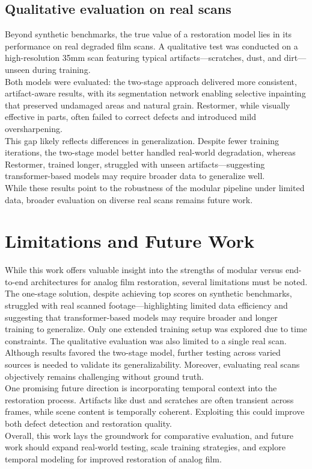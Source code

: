 \documentclass[10pt,a4paper,twocolumn,twoside]{article}
\begin{document}
\subsection{Qualitative evaluation on real scans}
Beyond synthetic benchmarks, the true value of a restoration model lies in its performance on real degraded film scans. A qualitative test was conducted on a high-resolution 35mm scan featuring typical artifacts—scratches, dust, and dirt—unseen during training. \\
Both models were evaluated: the two-stage approach delivered more consistent, artifact-aware results, with its segmentation network enabling selective inpainting that preserved undamaged areas and natural grain. Restormer, while visually effective in parts, often failed to correct defects and introduced mild oversharpening. \\
This gap likely reflects differences in generalization. Despite fewer training iterations, the two-stage model better handled real-world degradation, whereas Restormer, trained longer, struggled with unseen artifacts—suggesting transformer-based models may require broader data to generalize well. \\
While these results point to the robustness of the modular pipeline under limited data, broader evaluation on diverse real scans remains future work.
\section{Limitations and Future Work}
While this work offers valuable insight into the strengths of modular versus end-to-end architectures for analog film restoration, several limitations must be noted. \\ The one-stage solution, despite achieving top scores on synthetic benchmarks, struggled with real scanned footage—highlighting limited data efficiency and suggesting that transformer-based models may require broader and longer training to generalize. Only one extended training setup was explored due to time constraints. The qualitative evaluation was also limited to a single real scan. Although results favored the two-stage model, further testing across varied sources is needed to validate its generalizability. Moreover, evaluating real scans objectively remains challenging without ground truth. \\ One promising future direction is incorporating temporal context into the restoration process. Artifacts like dust and scratches are often transient across frames, while scene content is temporally coherent. Exploiting this could improve both defect detection and restoration quality.\\ Overall, this work lays the groundwork for comparative evaluation, and future work should expand real-world testing, scale training strategies, and explore temporal modeling for improved restoration of analog film.
\end{document}
